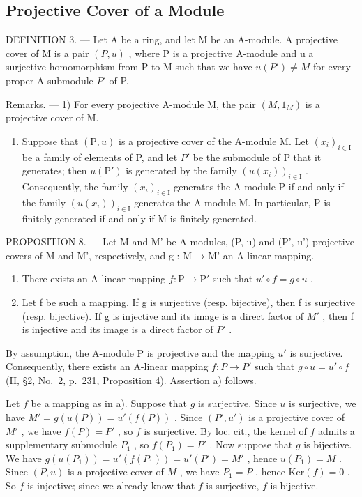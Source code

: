 \subsection{Projective Cover of a Module}

DEFINITION 3. --- Let A be a ring, and let M be an A-module. A projective cover of M is a pair \((P, u)\) , where P is a projective A-module and u a surjective homomorphism from P to M such that we have \(u(P') \neq M\) for every proper A-submodule \(P'\) of P.

Remarks. --- 1) For every projective A-module M, the pair \((M,1_{M})\) is a projective cover of M.

\begin{enumerate}
\def\labelenumi{\arabic{enumi})}
\setcounter{enumi}{1}
\tightlist
\item
  Suppose that \((\mathrm{P}, u)\) is a projective cover of the A-module M. Let \((x_{i})_{i \in \mathrm{I}}\) be a family of elements of P, and let \(P'\) be the submodule of P that it generates; then \(u(\mathrm{P}')\) is generated by the family \((u(x_{i}))_{i \in \mathrm{I}}\) . Consequently, the family \((x_{i})_{i \in \mathrm{I}}\) generates the A-module P if and only if the family \((u(x_{i}))_{i \in \mathrm{I}}\) generates the A-module M. In particular, P is finitely generated if and only if M is finitely generated.
\end{enumerate}

PROPOSITION 8. --- Let M and M' be A-modules, (P, u) and (P', u') projective covers of M and M', respectively, and g : M → M' an A-linear mapping.

\begin{enumerate}
\def\labelenumi{\alph{enumi})}
\item
  There exists an A-linear mapping \(f: \mathrm{P} \to \mathrm{P}'\) such that \(u' \circ f = g \circ u\) .
\item
  Let f be such a mapping. If g is surjective (resp. bijective), then f is surjective (resp. bijective). If g is injective and its image is a direct factor of \(M'\) , then f is injective and its image is a direct factor of \(P'\) .
\end{enumerate}

By assumption, the A-module P is projective and the mapping \(u'\) is surjective. Consequently, there exists an A-linear mapping \(f: P \to P'\) such that \(g \circ u = u' \circ f\) (II, §2, No.~2, p.~231, Proposition 4). Assertion a) follows.

Let \(f\) be a mapping as in a). Suppose that \(g\) is surjective. Since \(u\) is surjective, we have \(M' = g(u(P)) = u'(f(P))\) . Since \((P', u')\) is a projective cover of \(M'\) , we have \(f(P) = P'\) , so \(f\) is surjective. By loc. cit., the kernel of \(f\) admits a supplementary submodule \(P_1\) , so \(f(P_1) = P'\) . Now suppose that \(g\) is bijective. We have \(g(u(P_1)) = u'(f(P_1)) = u'(P') = M'\) , hence \(u(P_1) = M\) . Since \((P, u)\) is a projective cover of \(M\) , we have \(P_1 = P\) , hence \(\text{Ker}(f) = 0\) . So \(f\) is injective; since we already know that \(f\) is surjective, \(f\) is bijective.

